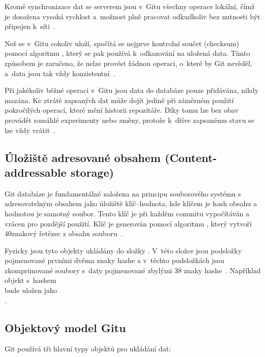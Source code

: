 Kromě synchronizace dat se serverem jsou v~Gitu všechny operace lokální, čímž je dosažena vysoká rychlost a~možnost plně pracovat odkudkoliv bez nutnosti být připojen k~síti~\cite{chacon2014progit}.

Než se v~Gitu cokoliv uloží, spočítá se nejprve kontrolní součet (checksum) pomocí algoritmu , který se pak používá k~odkazování na uložená data. Tímto způsobem je zaručeno, že nelze provést žádnou operaci, o~které by Git nevěděl, a~data jsou tak vždy konzistentní~\cite{chacon2014progit}.

Při jakékoliv běžné operaci v~Gitu jsou data do databáze pouze přidávána, nikdy mazána. Ke ztrátě zapsaných dat může dojít jedině při záměrném použití pokročilých operací, které mění historii repozitáře. Díky tomu lze bez obav provádět rozsáhlé experimenty nebo změny, protože k~dříve zapsanému stavu se lze vždy vrátit~\cite{chacon2014progit}.

\subsection{Úložiště adresované obsahem (Content-addressable storage)}
\label{sec:git_content_addressable_storage}
Git databáze je fundamentálně založena na principu souborového systému s adresovatelným obsahem jako úložiště klíč--hodnota, kde klíčem je hash obsahu a hodnotou je samotný soubor. Tento klíč je při každém commitu vypočítáván a vrácen pro pozdější použití.
Klíč je generován pomocí algoritmu , který vytvoří 40znakový řetězec z obsahu souboru~\cite{chacon2014progit}.

Fyzicky jsou tyto objekty ukládány do složky . V~této složce jsou podsložky pojmenované prvními dvěma znaky hashe a v~těchto podsložkách jsou zkomprimované soubory s~daty pojmenované zbylými 38 znaky hashe~\cite{chacon2014progit}. Například objekt s~hashem \\  bude uložen jako \\ .


\subsection{Objektový model Gitu}
\label{sec:git_object_model}
Git používá tři hlavní typy objektů pro ukládání dat:

